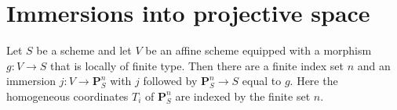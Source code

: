\section{Immersions into projective space}\label{sec:chow-immersions}

\begin{lemma}
\label{lem:chow-affine-immersion}
\leanok
Let $S$ be a scheme and let $V$ be an affine scheme equipped with a morphism
$g\colon V\to S$ that is locally of finite type.  Then there are a finite index
set $n$ and an immersion $j\colon V\to\mathbf P^n_S$ with
$j$ followed by $\mathbf P^n_S\to S$ equal to $g$.  Here the homogeneous
coordinates $T_i$ of $\mathbf P^n_S$ are indexed by the finite set $n$.
\end{lemma}
